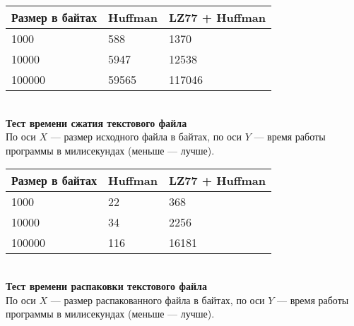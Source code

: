 \documentclass[12pt]{article}
\begin{document}
    \begin{tabular}{ | l | l | l | }
        \hline
            Размер в байтах & Huffman & LZ77 + Huffman \\ \hline
            1000            & 588     & 1370           \\
            10000           & 5947    & 12538          \\
            100000          & 59565   & 117046         \\
        \hline
    \end{tabular} \\

    \textbf{Тест времени сжатия текстового файла} \\
    По оси $X$ — размер исходного файла в байтах, по оси $Y$ — время работы 
    программы в милисекундах (меньше — лучше).


    \begin{tabular}{ | l | l | l | }
        \hline
            Размер в байтах & Huffman & LZ77 + Huffman \\ \hline
            1000            & 22      & 368            \\
            10000           & 34      & 2256           \\
            100000          & 116     & 16181          \\
        \hline
    \end{tabular} \\

    \textbf{Тест времени распаковки текстового файла} \\
    По оси $X$ — размер распакованного файла в байтах, по оси $Y$ — время 
    работы программы в милисекундах (меньше — лучше).

\end{document}
